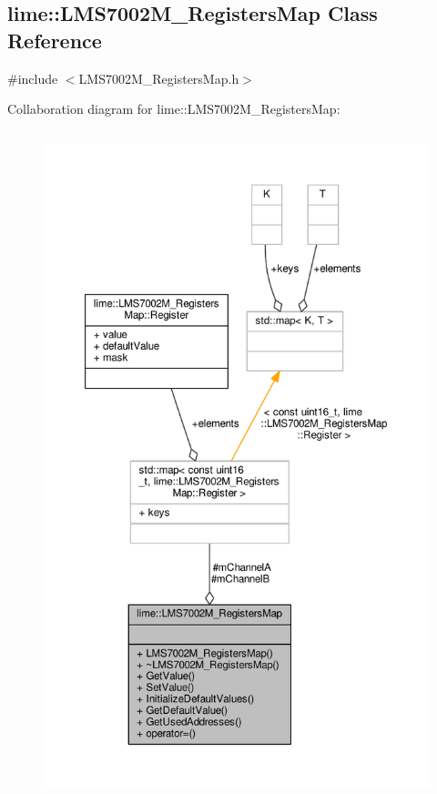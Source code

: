 \subsection{lime\+:\+:L\+M\+S7002\+M\+\_\+\+Registers\+Map Class Reference}
\label{classlime_1_1LMS7002M__RegistersMap}


{\ttfamily \#include $<$L\+M\+S7002\+M\+\_\+\+Registers\+Map.\+h$>$}



Collaboration diagram for lime\+:\+:L\+M\+S7002\+M\+\_\+\+Registers\+Map\+:
\nopagebreak
\begin{figure}[H]
\begin{center}
\leavevmode
\includegraphics[height=550pt]{d9/df0/classlime_1_1LMS7002M__RegistersMap__coll__graph}
\end{center}
\end{figure}
